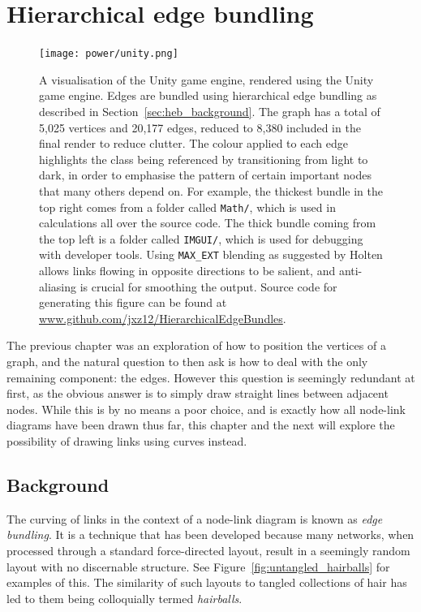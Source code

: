 \chapter{Hierarchical edge bundling}
\label{chap:heb}
\begin{figure}
  \centering
  \texttt{[image: power/unity.png]}
  \caption[The Unity game engine, visualised using the Unity game engine]{A visualisation of the Unity game engine, rendered using the Unity game engine.
  Edges are bundled using hierarchical edge bundling as described in Section~\ref{sec:heb_background}. The graph has a total of 5,025 vertices and 20,177 edges, reduced to 8,380 included in the final render to reduce clutter. The colour applied to each edge highlights the class being referenced by transitioning from light to dark, in order to emphasise the pattern of certain important nodes that many others depend on. For example, the thickest bundle in the top right comes from a folder called \texttt{Math/}, which is used in calculations all over the source code. The thick bundle coming from the top left is a folder called \texttt{IMGUI/}, which is used for debugging with developer tools.
  Using \texttt{MAX\_EXT} blending as suggested by Holten \cite{Holten2006} allows links flowing in opposite directions to be salient, and anti-aliasing is crucial for smoothing the output. Source code for generating this figure can be found at \url{www.github.com/jxz12/HierarchicalEdgeBundles}.}
  \label{fig:metaunity}
\end{figure}
The previous chapter was an exploration of how to position the vertices of a graph, and the natural question to then ask is how to deal with the only remaining component: the edges. However this question is seemingly redundant at first, as the obvious answer is to simply draw straight lines between adjacent nodes. While this is by no means a poor choice, and is exactly how all node-link diagrams have been drawn thus far, this chapter and the next will explore the possibility of drawing links using curves instead.

\section{Background}
\label{sec:edges_background}
The curving of links in the context of a node-link diagram is known as \textit{edge bundling}. It is a technique that has been developed because many networks, when processed through a standard force-directed layout, result in a seemingly random layout with no discernable structure. See Figure~\ref{fig:untangled_hairballs} for examples of this. The similarity of such layouts to tangled collections of hair has led to them being colloquially termed \textit{hairballs}.

